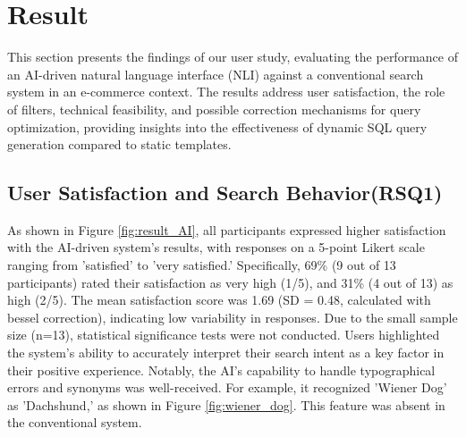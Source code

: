 \documentclass[../../submission.tex]{subfiles}
\begin{document}
\section{Result}
This section presents the findings of our user study, evaluating the performance of an 
AI-driven natural language interface (NLI) against a conventional search system in 
an e-commerce context. The results address user satisfaction, the role of filters, 
technical feasibility, and possible correction mechanisms for query optimization, providing insights 
into the effectiveness of dynamic SQL query generation compared to static templates.

\subsection{User Satisfaction and Search Behavior(RSQ1)}
As shown in Figure \ref{fig:result_AI}, all participants expressed higher satisfaction with the 
AI-driven system’s results, with responses on a 5-point Likert scale ranging from 
'satisfied' to 'very satisfied.' Specifically, 69\% (9 out of 13 participants) 
rated their satisfaction as very high (1/5), and 31\% (4 out of 13) as high (2/5). 
The mean satisfaction score was 1.69 (SD = 0.48, calculated with bessel correction), indicating low variability in responses. Due to the small sample size (n=13), statistical significance tests were not conducted.
 Users highlighted the system’s ability 
to accurately interpret their search intent as a key factor in their positive experience. 
Notably, the AI’s capability to handle typographical errors and synonyms was well-received. 
For example, it recognized 'Wiener Dog' as 'Dachshund,' as shown in Figure \ref{fig:wiener_dog}. 
This feature was absent in the conventional system.
\end{document}
